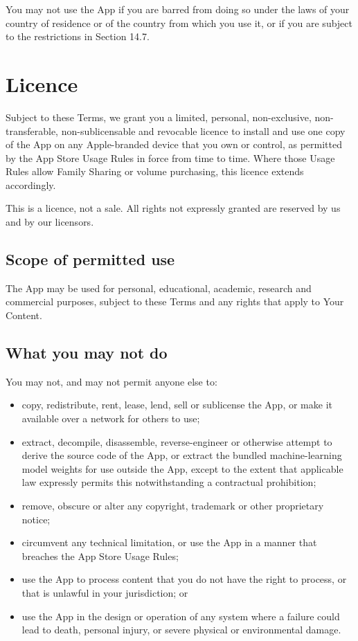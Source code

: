\documentclass[11pt]{article}
\begin{document}
You may not use the App if you are barred from doing so under the laws of your country
of residence or of the country from which you use it, or if you are subject to the
restrictions in Section 14.7.

\section{Licence}

Subject to these Terms, we grant you a limited, personal, non-exclusive,
non-transferable, non-sublicensable and revocable licence to install and use one copy
of the App on any Apple-branded device that you own or control, as permitted by the
App Store Usage Rules in force from time to time. Where those Usage Rules allow Family
Sharing or volume purchasing, this licence extends accordingly.

This is a licence, not a sale. All rights not expressly granted are reserved by us and
by our licensors.

\subsection{Scope of permitted use}
The App may be used for personal, educational, academic, research and commercial
purposes, subject to these Terms and any rights that apply to Your Content.

\subsection{What you may not do}
You may not, and may not permit anyone else to:

\begin{itemize}
  \item copy, redistribute, rent, lease, lend, sell or sublicense the App, or make it
        available over a network for others to use;
  \item extract, decompile, disassemble, reverse-engineer or otherwise attempt to
        derive the source code of the App, or extract the bundled machine-learning
        model weights for use outside the App, except to the extent that applicable law
        expressly permits this notwithstanding a contractual prohibition;
  \item remove, obscure or alter any copyright, trademark or other proprietary notice;
  \item circumvent any technical limitation, or use the App in a manner that breaches
        the App Store Usage Rules;
  \item use the App to process content that you do not have the right to process, or
        that is unlawful in your jurisdiction; or
  \item use the App in the design or operation of any system where a failure could
        lead to death, personal injury, or severe physical or environmental damage.
\end{itemize}
\end{document}
